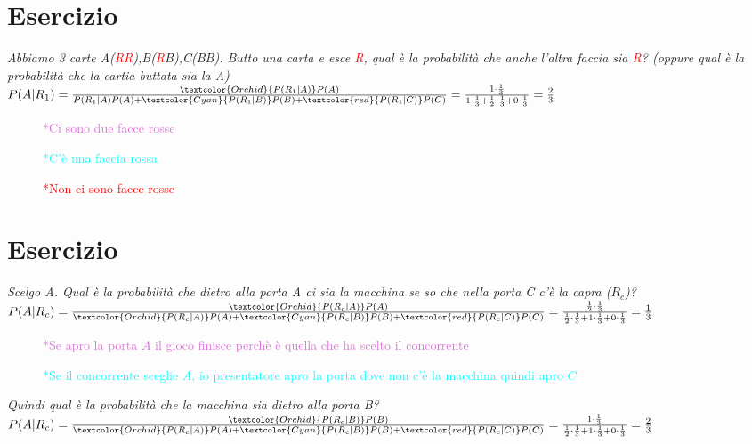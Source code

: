 \documentclass[12pt]{article}
\begin{document}
\section{Esercizio}
\textit{Abbiamo 3 carte A(\textcolor{red}{RR}),B(\textcolor{red}{R}B),C(BB). Butto una carta e esce \textcolor{red}{R}, qual è la probabilità che anche l'altra faccia sia \textcolor{red}{R}? (oppure qual è la probabilità che la cartia buttata sia la A)}\\
\(P(A|R_{1})=\frac{\textcolor{Orchid}{P(R_{1}|A)}P(A)}{P(R_{1}|A)P(A)+\textcolor{Cyan}{P(R_{1}|B)}P(B)+\textcolor{red}{P(R_{1}|C)}P(C)}=\frac{1\cdot \frac{1}{3}}{1\cdot \frac{1}{3}+\frac{1}{2}\cdot \frac{1}{3}+0\cdot\frac{1}{3}}=\frac{2}{3}\)
\begin{description}
    \item[] \textcolor{Orchid}{*Ci sono due facce rosse} 
    \item[] \textcolor{Cyan}{*C'è una faccia rossa}
    \item[] \textcolor{red}{*Non ci sono facce rosse}
\end{description}
\section{Esercizio}
\begin{center}
\end{center}
\textit{Scelgo A. Qual è la probabilità che dietro alla porta A ci sia la macchina se so che nella porta C c'è la capra ($R_{c}$)?}\\
\(P(A|R_{c})=\frac{\textcolor{Orchid}{P(R_{c}|A)}P(A)}{\textcolor{Orchid}{P(R_{c}|A)}P(A)+\textcolor{Cyan}{P(R_{c}|B)}P(B)+\textcolor{red}{P(R_{c}|C)}P(C)}=\frac{\frac{1}{2}\cdot\frac{1}{3}}{\frac{1}{2}\cdot\frac{1}{3}+1\cdot\frac{1}{3}+0\cdot\frac{1}{3}}=\frac{1}{3}\)
\begin{description}
    \item[] \textcolor{Orchid}{*Se apro la porta $A$ il gioco finisce perchè è quella che ha scelto il concorrente} 
    \item[] \textcolor{Cyan}{*Se il concorrente sceglie $A$, io presentatore apro la porta dove non c'è la macchina quindi apro $C$}
\end{description}
\textit{Quindi qual è la probabilità che la macchina sia dietro alla porta B?}\\
\(P(A|R_{c})=\frac{\textcolor{Orchid}{P(R_{c}|B)}P(B)}{\textcolor{Orchid}{P(R_{c}|A)}P(A)+\textcolor{Cyan}{P(R_{c}|B)}P(B)+\textcolor{red}{P(R_{c}|C)}P(C)}=\frac{1\cdot\frac{1}{3}}{\frac{1}{2}\cdot\frac{1}{3}+1\cdot\frac{1}{3}+0\cdot\frac{1}{3}}=\frac{2}{3}\)
\end{document}

